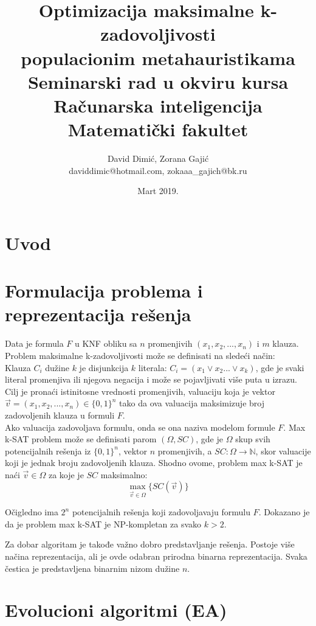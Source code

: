 \documentclass{article}
\title{Optimizacija maksimalne k-zadovoljivosti\\ populacionim metahauristikama\\ \small{Seminarski rad u okviru kursa\\ Računarska inteligencija\\ Matematički fakultet}}
\author{David Dimić, Zorana Gajić \\ daviddimic@hotmail.com, zokaaa\_gajich@bk.ru}
\date{Mart 2019.}
\begin{document}
\maketitle  
\tableofcontents
\newpage

\abstract{
}

\section{Uvod}
\label{sec:uvod}

\section{Formulacija problema  i reprezentacija rešenja}
\label{sec:problem_resenje}

Data je formula $F$ u KNF obliku sa $n$ promenjivih $(x_1, x_2, ..., x_n)$ i $m$ klauza. Problem maksimalne k-zadovoljivosti može se definisati na sledeći način:\\ 

Klauza $C_i$ dužine $k$ je disjunkcija $k$ literala: 
$C_i = (x_1  \vee x_2 ... \vee x_k)$, gde je svaki literal promenjiva ili njegova negacija i može se pojavljivati više puta u izrazu.
Cilj je pronaći istinitosne vrednosti promenjivih, valuaciju koja je vektor $\vec{v} = (x_1, x_2, ..., x_n) \in \{ 0,1 \}^n$ tako da ova valuacija maksimizuje broj zadovoljenih klauza u formuli $F$.\\

Ako valuacija zadovoljava formulu, onda se ona naziva modelom formule $F$. Max k-SAT problem može se definisati parom $(\Omega, SC)$, gde je $\Omega$ skup svih potencijalnih rešenja iz $\{0,1\}^n$, vektor $n$ promenjivih, a $SC:\Omega \rightarrow \mathbb{N}$, skor valuacije koji je jednak broju zadovoljenih klauza. Shodno ovome, problem max k-SAT je naći $\vec{v} \in \Omega$ za koje je $SC$ maksimalno:\\
$$\max_{\vec{v} \in \Omega}\{SC(\vec{v})\}$$

Očigledno ima $2^n$ potencijalnih rešenja koji zadovoljavaju formulu $F$. Dokazano je da je problem max k-SAT je NP-kompletan za svako $k>2$. %

Za dobar algoritam je takođe važno dobro predstavljanje rešenja. Postoje više načina reprezentacija, ali je ovde odabran prirodna binarna reprezentacija. Svaka čestica je predstavljena binarnim nizom dužine $n$.


\section{Evolucioni algoritmi (EA)}
\label{sec:ea}
\end{document}

